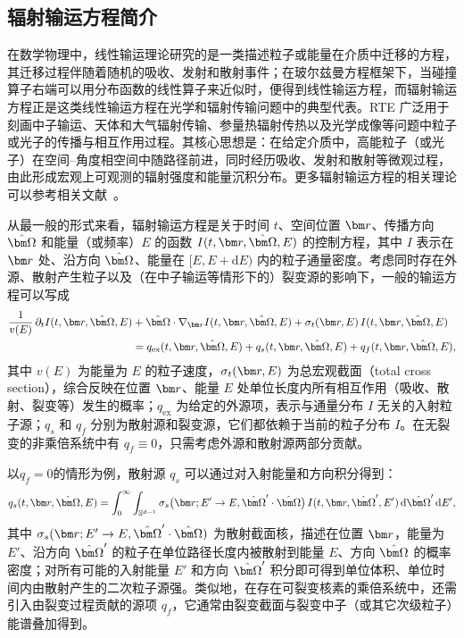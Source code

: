 
\subsection{辐射输运方程简介}

在数学物理中，线性输运理论研究的是一类描述粒子或能量在介质中迁移的方程，其迁移过程伴随着随机的吸收、发射和散射事件；在玻尔兹曼方程框架下，当碰撞算子右端可以用分布函数的线性算子来近似时，便得到线性输运方程，而辐射输运方程正是这类线性输运方程在光学和辐射传输问题中的典型代表。RTE 广泛用于刻画中子输运、天体和大气辐射传输、参量热辐射传热以及光学成像等问题中粒子或光子的传播与相互作用过程。其核心思想是：在给定介质中，高能粒子（或光子）在空间–角度相空间中随路径前进，同时经历吸收、发射和散射等微观过程，由此形成宏观上可观测的辐射强度和能量沉积分布。更多辐射输运方程的相关理论可以参考相关文献~\cite{chandrasekhar2013radiative, zhao2018radiative,zhang2019differential, herman1965numerical}。

从最一般的形式来看，辐射输运方程是关于时间 $t$、空间位置 $\br$、传播方向 $\bOmega$ 和能量（或频率）$E$ 的函数 $I(t,\br,\bOmega,E)$ 的控制方程，其中 $I$ 表示在 $\br$ 处、沿方向 $\bOmega$、能量在 $[E,E+\mathrm{d}E)$ 内的粒子通量密度。考虑同时存在外源、散射产生粒子以及（在中子输运等情形下的）裂变源的影响下，一般的输运方程可以写成
\begin{equation}
    \begin{aligned}
        \frac{1}{v(E)} \, \partial_t I(t,\br,\bOmega,E)
         & + \bOmega \cdot \nabla_{\br} I(t,\br,\bOmega,E) + \sigma_t(\br,E) \, I(t,\br,\bOmega,E) \\
         & = q_{\mathrm{ex}}(t,\br,\bOmega,E) + q_s(t,\br,\bOmega,E) + q_f(t,\br,\bOmega,E),
    \end{aligned}
\end{equation}
其中 $v(E)$ 为能量为 $E$ 的粒子速度，$\sigma_t(\br,E)$ 为总宏观截面（total cross section），综合反映在位置 $\br$、能量 $E$ 处单位长度内所有相互作用（吸收、散射、裂变等）发生的概率；$q_{\mathrm{ex}}$ 为给定的外源项，表示与通量分布 $I$ 无关的入射粒子源；$q_s$ 和 $q_f$ 分别为散射源和裂变源，它们都依赖于当前的粒子分布 $I$。在无裂变的非乘倍系统中有 $q_f \equiv 0$，只需考虑外源和散射源两部分贡献。

以$q_f=0$的情形为例，散射源 $q_s$ 可以通过对入射能量和方向积分得到：
\begin{equation}
    q_s(t,\br,\bOmega,E)
    = \int_0^{\infty} \int_{\sS^{d-1}}
    \sigma_s\bigl(\br; E' \to E,\bOmega' \cdot \bOmega\bigr) \,
    I(t,\br,\bOmega',E')\,\mathrm{d}\bOmega'\,\mathrm{d}E',
\end{equation}
其中 $\sigma_s(\br; E' \to E,\bOmega' \cdot \bOmega)$ 为散射截面核，描述在位置 $\br$，能量为 $E'$、沿方向 $\bOmega'$ 的粒子在单位路径长度内被散射到能量 $E$、方向 $\bOmega$ 的概率密度；对所有可能的入射能量 $E'$ 和方向 $\bOmega'$ 积分即可得到单位体积、单位时间内由散射产生的二次粒子源强。类似地，在存在可裂变核素的乘倍系统中，还需引入由裂变过程贡献的源项 $q_f$，它通常由裂变截面与裂变中子（或其它次级粒子）能谱叠加得到。

